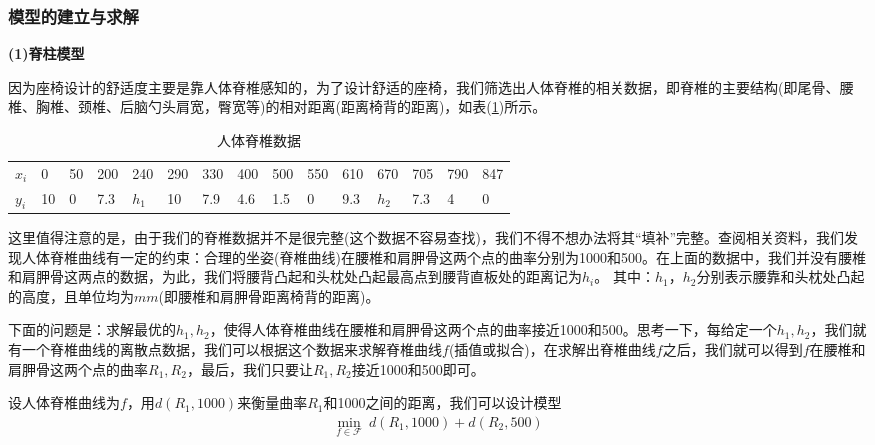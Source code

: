         \subsubsection{模型的建立与求解}
            \par
            \textbf{(1)脊柱模型}
            \par
            因为座椅设计的舒适度主要是靠人体脊椎感知的，为了设计舒适的座椅，我们筛选出人体脊椎的相关数据，即脊椎的主要结构(即尾骨、腰椎、胸椎、颈椎、后脑勺头肩宽，臀宽等)的相对距离(距离椅背的距离)，如表(\ref{人体脊椎数据})所示。
            \begin{table}[H]
            \centering
            \caption{人体脊椎数据}
            \label{人体脊椎数据}
            \begin{tabular}{l|llllllllllllll}%
                \toprule
                $x_i$  &0 &  50 & 200& 240& 290& 330& 400& 500& 550& 610 & 670& 705&  790& 847\\
                $y_i$ &10&  0  & 7.3& $h_1$ & 10 & 7.9& 4.6& 1.5& 0  & 9.3 & $h_2$ & 7.3&  4  & 0\\
            \bottomrule
            \end{tabular}
            \end{table}
            \par
            这里值得注意的是，由于我们的脊椎数据并不是很完整(这个数据不容易查找)，我们不得不想办法将其“填补”完整。查阅相关资料，我们发现人体脊椎曲线有一定的约束：合理的坐姿(脊椎曲线)在腰椎和肩胛骨这两个点的曲率分别为1000和500。在上面的数据中，我们并没有腰椎和肩胛骨这两点的数据，为此，我们将腰背凸起和头枕处凸起最高点到腰背直板处的距离记为$h_i$。
            其中：$h_1$，$h_2$分别表示腰靠和头枕处凸起的高度，且单位均为$mm$(即腰椎和肩胛骨距离椅背的距离)。
            \par
            下面的问题是：求解最优的$h_1,h_2$，使得人体脊椎曲线在腰椎和肩胛骨这两个点的曲率接近1000和500。思考一下，每给定一个$h_1,h_2$，我们就有一个脊椎曲线的离散点数据，我们可以根据这个数据来求解脊椎曲线$f$(插值或拟合)，在求解出脊椎曲线$f$之后，我们就可以得到$f$在腰椎和肩胛骨这两个点的曲率$R_1,R_2$，最后，我们只要让$R_1,R_2$接近1000和500即可。
            \par
            设人体脊椎曲线为$f$，用$d(R_1,1000)$来衡量曲率$R_1$和1000之间的距离，我们可以设计模型
            \begin{align*}
            \min_{f\in \mathcal{F}} \ d(R_1,1000)+d(R_2,500)
            \end{align*}

